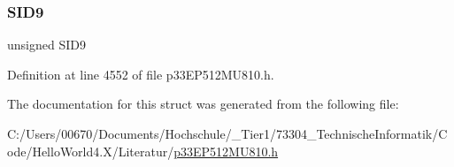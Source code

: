 \subsubsection{\texorpdfstring{S\+I\+D9}{SID9}}
{\footnotesize\ttfamily unsigned S\+I\+D9}



Definition at line 4552 of file p33\+E\+P512\+M\+U810.\+h.



The documentation for this struct was generated from the following file\+:\begin{DoxyCompactItemize}
\item 
C\+:/\+Users/00670/\+Documents/\+Hochschule/\+\_\+\+Tier1/73304\+\_\+\+Technische\+Informatik/\+Code/\+Hello\+World4.\+X/\+Literatur/\hyperlink{p33_e_p512_m_u810_8h}{p33\+E\+P512\+M\+U810.\+h}\end{DoxyCompactItemize}
